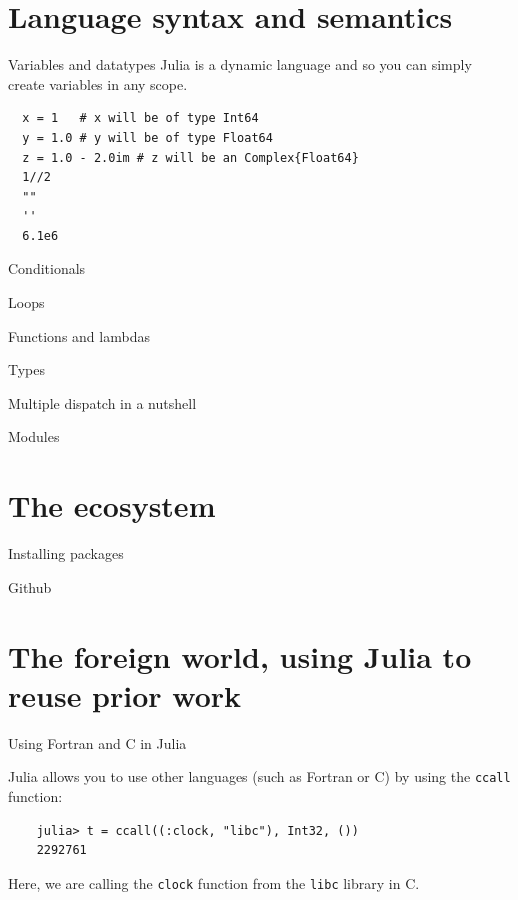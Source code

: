 \documentclass{beamer}
\begin{document}
\section{Language syntax and semantics}
\begin{frame}[fragile]{Variables and datatypes}
  Julia is a dynamic language and so you can simply create variables in any scope.
  \begin{Verbatim}
  x = 1   # x will be of type Int64
  y = 1.0 # y will be of type Float64
  z = 1.0 - 2.0im # z will be an Complex{Float64}
  1//2
  ""
  ''
  6.1e6

  \end{Verbatim}
\end{frame}
\begin{frame}[fragile]{Conditionals}
\end{frame}
\begin{frame}[fragile]{Loops}
\end{frame}
\begin{frame}[fragile]{Functions and lambdas}
\end{frame}
\begin{frame}[fragile]{Types}
\end{frame}
\begin{frame}[fragile]{Multiple dispatch in a nutshell}
\end{frame}
\begin{frame}[fragile]{Modules}
\end{frame}
\section{The ecosystem}
\begin{frame}{Installing packages}
\end{frame}
\begin{frame}{Github}
\end{frame}
\section{The foreign world, using Julia to reuse prior work}

\begin{frame}[fragile]{Using Fortran and C in Julia}

Julia allows you to use other languages (such as Fortran or C) by using the \texttt{ccall} function:

\begin{Verbatim}
    julia> t = ccall((:clock, "libc"), Int32, ())
    2292761
\end{Verbatim}

Here, we are calling the \texttt{clock} function from the \texttt{libc} library in C.

\end{frame}
\end{document}
